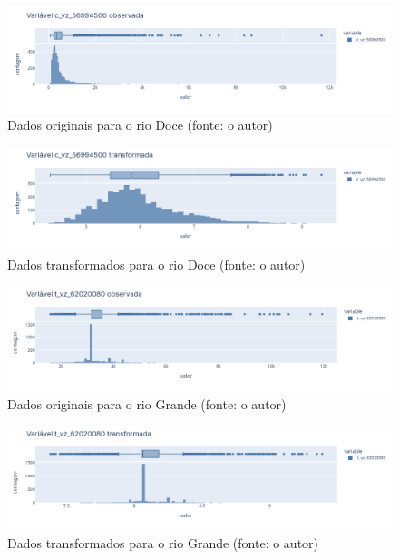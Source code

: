 \begin{figure}[!h]
\centering
\includegraphics[scale=0.33]{Figuras/rio_doce_antes_log.png}
\caption{Dados originais para o rio Doce (fonte: o autor)}
\label{fig:rio_doce_antes_log}
\end{figure}

\begin{figure}[!h]
\centering
\includegraphics[scale=0.33]{Figuras/rio_doce_depois_log.png}
\caption{Dados transformados para o rio Doce (fonte: o autor)}
\label{fig:rio_doce_depois_log}
\end{figure}

\begin{figure}[!h]
\centering
\includegraphics[scale=0.33]{Figuras/rio_grande_antes_log.png}
\caption{Dados originais para o rio Grande (fonte: o autor)}
\label{fig:rio_grande_antes_log}
\end{figure}

\begin{figure}[!h]
\centering
\includegraphics[scale=0.33]{Figuras/rio_grande_depois_log.png}
\caption{Dados transformados para o rio Grande (fonte: o autor)}
\label{fig:rio_grande_depois_log}
\end{figure}

